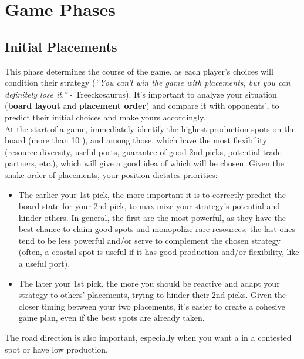 \documentclass[12pt]{article}
\begin{document}
\section{Game Phases}
\subsection{Initial Placements}
This phase determines the course of the game, as each player's choices will condition their strategy (\textit{``You can't win the game with placements, but you can definitely lose it.''} - Treeckosaurus).
It's important to analyze your situation (\textbf{board layout} and \textbf{placement order}) and compare it with opponents', to predict their initial choices and make yours accordingly. \\
At the start of a game, immediately identify the highest production spots on the board (more than 10 \raisebox{0.2\height}{\textbullet}), and among those, which have the most flexibility (resource diversity, useful ports, guarantee of good 2nd picks, potential trade partners, etc.), which will give a good idea of which will be chosen.
Given the snake order of placements, your position dictates priorities:
\begin{itemize}
    \item The earlier your 1st pick, the more important it is to correctly predict the board state for your 2nd pick, to maximize your strategy's potential and hinder others.
    In general, the first  are the most powerful, as they have the best chance to claim good spots and monopolize rare resources;
    the last ones tend to be less powerful and/or serve to complement the chosen strategy (often, a coastal spot is useful if it has good production and/or flexibility, like a useful port).
    \item The later your 1st pick, the more you should be reactive and adapt your strategy to others' placements, trying to hinder their 2nd picks.
    Given the closer timing between your two placements, it's easier to create a cohesive game plan, even if the best spots are already taken.
\end{itemize}
The road direction is also important, especially when you want a  in a contested spot or have low  production.
\end{document}
